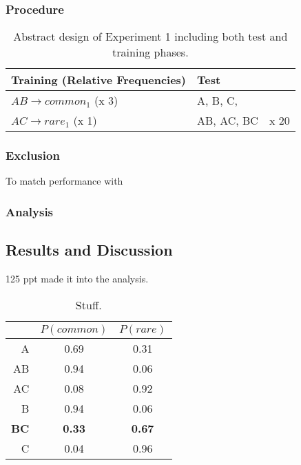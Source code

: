 \documentclass[10pt,letterpaper]{article}
\begin{document}
\subsubsection*{Procedure}

\begin{table}[!ht]
  \begin{center}
    \caption{Abstract design of Experiment 1 including both test and training phases. \\}
    \label{tab:abstract-exp1}
    \begin{tabular}{llr} %
      \textbf{Training (Relative Frequencies)} & \textbf{Test}& \\
      \hline
      $AB \to common_{1}$ (x 3) &  A, B, C,         &  \\
      $AC \to rare_{1}$   (x 1) &  AB, AC, BC      & x 20 \\
      \hline
    \end{tabular}
  \end{center}
\end{table}

\subsubsection*{Exclusion}

To match performance with 

\subsubsection*{Analysis}

\subsection{Results and Discussion}

125 ppt made it into the analysis.

\begin{table}[H]
  \begin{center}
    \caption{Stuff. \\}
    \label{tab:results-exp1}
    \vskip 0.12in
    \begin{tabular}{rcc}
      \hline
      & $P(common)$ & $P(rare)$ \\
      \hline
      A & 0.69 & 0.31 \\
      AB & 0.94 & 0.06 \\
      AC & 0.08 & 0.92 \\
      B & 0.94 & 0.06 \\
      \textbf{BC} & \textbf{0.33} & \textbf{0.67} \\
      C & 0.04 & 0.96 \\
    \end{tabular}
  \end{center}
\end{table}
\end{document}
